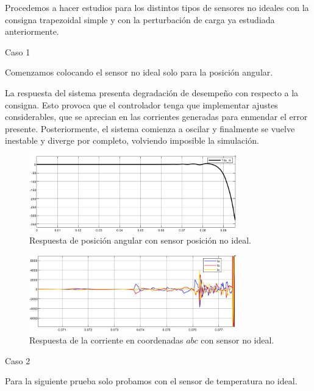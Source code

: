 \documentclass{article}
\begin{document}
Procedemos a hacer estudios para los distintos tipos de sensores no ideales con la consigna trapezoidal 
simple y con la perturbación de carga ya estudiada anteriormente.

\bullet Caso 1

Comenzamos colocando el sensor no ideal solo para la posición angular.

La respuesta del sistema presenta degradación de desempeño con respecto a la consigna. Esto provoca 
que el controlador tenga que implementar ajustes considerables, que se aprecian en las corrientes 
generadas para enmendar el error presente. Posteriormente, el sistema comienza a oscilar y 
finalmente se vuelve inestable y diverge por completo, volviendo imposible la simulación.

\begin{figure}[H]
    \centering
    \includegraphics[width=0.8\textwidth]{5.2.5.d.1.png}
    \caption{Respuesta de posición angular con sensor posición no ideal.}
\end{figure}

\begin{figure}[H]
    \centering
    \includegraphics[width=0.8\textwidth]{5.2.5.d.2.png}
    \caption{Respuesta de la corriente en coordenadas $abc$ con sensor no ideal.}
\end{figure}

\bullet Caso 2

Para la siguiente prueba solo probamos con el sensor de temperatura no ideal.
\end{document}
